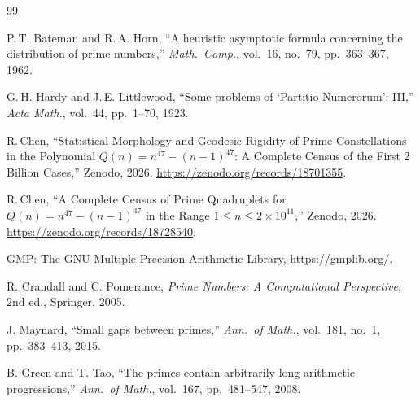 \documentclass[11pt,a4paper]{article}
\begin{document}
\begin{thebibliography}{99}

P.\,T. Bateman and R.\,A. Horn,
``A heuristic asymptotic formula concerning the distribution of prime numbers,''
\textit{Math.\ Comp.}, vol.~16, no.~79, pp.~363--367, 1962.

G.\,H. Hardy and J.\,E. Littlewood,
``Some problems of `Partitio Numerorum'; III,''
\textit{Acta Math.}, vol.~44, pp.~1--70, 1923.

R.\,Chen,
``Statistical Morphology and Geodesic Rigidity of Prime Constellations in
the Polynomial $Q(n) = n^{47} - (n-1)^{47}$:
A Complete Census of the First 2 Billion Cases,''
Zenodo, 2026.
\url{https://zenodo.org/records/18701355}.

R.\,Chen,
``A Complete Census of Prime Quadruplets for
$Q(n) = n^{47} - (n-1)^{47}$ in the Range
$1 \leq n \leq 2 \times 10^{11}$,''
Zenodo, 2026.
\url{https://zenodo.org/records/18728540}.

GMP: The GNU Multiple Precision Arithmetic Library,
\url{https://gmplib.org/}.

R. Crandall and C. Pomerance,
\textit{Prime Numbers: A Computational Perspective},
2nd ed., Springer, 2005.

J. Maynard,
``Small gaps between primes,''
\textit{Ann.\ of Math.}, vol.~181, no.~1, pp.~383--413, 2015.

B. Green and T. Tao,
``The primes contain arbitrarily long arithmetic progressions,''
\textit{Ann.\ of Math.}, vol.~167, pp.~481--547, 2008.

\end{thebibliography}
\end{document}
